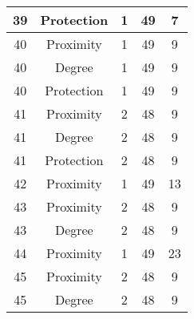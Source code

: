 \documentclass[results.tex]{subfiles}
\begin{document}
\begin{center}
\begin{tabular}{| c || c | c | c | c |}
            \hline
            39                      & Protection                   & 1                      & 49                      & 7                    \\
            \hline
            40                      & Proximity                    & 1                      & 49                      & 9                    \\
            \hline
            40                      & Degree                       & 1                      & 49                      & 9                    \\
            \hline
            40                      & Protection                   & 1                      & 49                      & 9                    \\
            \hline
            41                      & Proximity                    & 2                      & 48                      & 9                    \\
            \hline
            41                      & Degree                       & 2                      & 48                      & 9                    \\
            \hline
            41                      & Protection                   & 2                      & 48                      & 9                    \\
            \hline
            42                      & Proximity                    & 1                      & 49                      & 13                   \\
            \hline
            43                      & Proximity                    & 2                      & 48                      & 9                    \\
            \hline
            43                      & Degree                       & 2                      & 48                      & 9                    \\
            \hline
            44                      & Proximity                    & 1                      & 49                      & 23                   \\
            \hline
            45                      & Proximity                    & 2                      & 48                      & 9                    \\
            \hline
            45                      & Degree                       & 2                      & 48                      & 9                    \\

\end{tabular}
\end{center}
\end{document}
